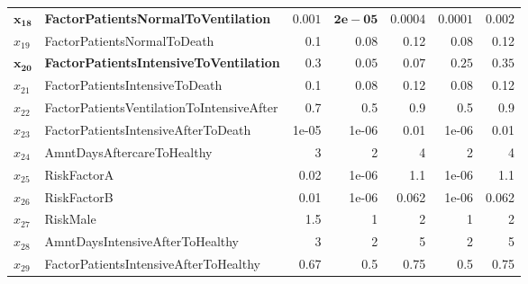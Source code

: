 \documentclass[conference]{IEEEtran}
\begin{document}
\begin{table}[ht]
\begin{tabular}{llrrrrr}
$\mathbf{x_{18}}$&   \textbf{FactorPatientsNormalToVentilation} & $\mathbf{0.001}$ & $\mathbf{2e-05}$ & $\mathbf{0.0004}$ & $\mathbf{0.0001}$ & $\mathbf{ 0.002}$ \\ 
$x_{19}$&   FactorPatientsNormalToDeath & 0.1 & 0.08 & 0.12 & 0.08 & 0.12 \\ 
$\mathbf{x_{20}}$&   \textbf{FactorPatientsIntensiveToVentilation} & $\mathbf{0.3}$ & $\mathbf{0.05}$ & $\mathbf{0.07}$ & $\mathbf{0.25}$ & $\mathbf{0.35}$ \\ 
$x_{21}$&   FactorPatientsIntensiveToDeath & 0.1 & 0.08 & 0.12 & 0.08 & 0.12 \\  
$x_{22}$&   FactorPatientsVentilationToIntensiveAfter & 0.7 & 0.5 & 0.9 & 0.5 & 0.9 \\ 
$x_{23}$&   FactorPatientsIntensiveAfterToDeath & 1e-05 & 1e-06 & 0.01 & 1e-06 & 0.01 \\ 
$x_{24}$&   AmntDaysAftercareToHealthy &   3 &   2 &   4 &   2 &   4 \\ 
$x_{25}$&   RiskFactorA & 0.02 & 1e-06 & 1.1 & 1e-06 & 1.1 \\
$x_{26}$&   RiskFactorB & 0.01 & 1e-06 & 0.062 & 1e-06 & 0.062 \\ 
$x_{27}$&   RiskMale & 1.5 &   1 &   2 &   1 &   2 \\  
$x_{28}$&   AmntDaysIntensiveAfterToHealthy &   3 &   2 &   5 &   2 &   5 \\ 
$x_{29}$&   FactorPatientsIntensiveAfterToHealthy & 0.67 & 0.5 & 0.75 & 0.5 & 0.75 \\ 
   \hline
\end{tabular}
\end{table}
\end{document}
